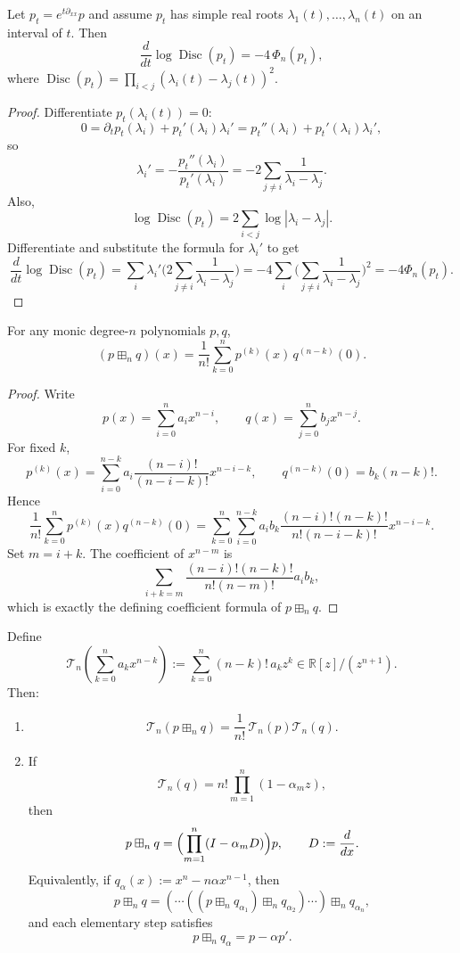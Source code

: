 \begin{lemma}\label{lem:q4-debruijn}
Let $p_t=e^{t\partial_{xx}}p$ and assume $p_t$ has simple real roots $\lambda_1(t),\dots,\lambda_n(t)$ on an interval of $t$. Then
\[
\frac{d}{dt}\log\operatorname{Disc}(p_t)=-4\,\Phi_n(p_t),
\]
where $\operatorname{Disc}(p_t)=\prod_{i<j}(\lambda_i(t)-\lambda_j(t))^2$.
\end{lemma}

\begin{proof}
Differentiate $p_t(\lambda_i(t))=0$:
\[
0=\partial_t p_t(\lambda_i)+p_t'(\lambda_i)\lambda_i'=p_t''(\lambda_i)+p_t'(\lambda_i)\lambda_i',
\]
so
\[
\lambda_i'=-\frac{p_t''(\lambda_i)}{p_t'(\lambda_i)}=-2\sum_{j\ne i}\frac{1}{\lambda_i-\lambda_j}.
\]
Also,
\[
\log\operatorname{Disc}(p_t)=2\sum_{i<j}\log|\lambda_i-\lambda_j|.
\]
Differentiate and substitute the formula for $\lambda_i'$ to get
\[
\frac{d}{dt}\log\operatorname{Disc}(p_t)
=\sum_i \lambda_i'\Big(2\sum_{j\ne i}\frac{1}{\lambda_i-\lambda_j}\Big)
=-4\sum_i\Big(\sum_{j\ne i}\frac{1}{\lambda_i-\lambda_j}\Big)^2
=-4\Phi_n(p_t).
\]
\end{proof}

\begin{lemma}\label{lem:q4-diffrepr}
For any monic degree-$n$ polynomials $p,q$,
\[
(p\boxplus_n q)(x)=\frac{1}{n!}\sum_{k=0}^{n} p^{(k)}(x)\,q^{(n-k)}(0).
\]
\end{lemma}

\begin{proof}
Write
\[
p(x)=\sum_{i=0}^n a_i x^{n-i},\qquad q(x)=\sum_{j=0}^n b_j x^{n-j}.
\]
For fixed $k$,
\[
p^{(k)}(x)=\sum_{i=0}^{n-k} a_i\frac{(n-i)!}{(n-i-k)!}x^{n-i-k},
\qquad
q^{(n-k)}(0)=b_k (n-k)!.
\]
Hence
\[
\frac1{n!}\sum_{k=0}^{n} p^{(k)}(x)q^{(n-k)}(0)
=
\sum_{k=0}^{n}\sum_{i=0}^{n-k}
a_i b_k\frac{(n-i)!(n-k)!}{n!(n-i-k)!}x^{n-i-k}.
\]
Set $m=i+k$. The coefficient of $x^{n-m}$ is
\[
\sum_{i+k=m}\frac{(n-i)!(n-k)!}{n!(n-m)!}a_i b_k,
\]
which is exactly the defining coefficient formula of $p\boxplus_n q$.
\end{proof}

\begin{lemma}\label{lem:q4-transform-factor}
Define
\[
\mathcal T_n\!\left(\sum_{k=0}^{n}a_k x^{n-k}\right):=
\sum_{k=0}^{n}(n-k)!\,a_k z^k\in \mathbb R[z]/(z^{n+1}).
\]
Then:
\begin{enumerate}
\item
\[
\mathcal T_n(p\boxplus_n q)=\frac1{n!}\,\mathcal T_n(p)\mathcal T_n(q).
\]
\item If
\[
\mathcal T_n(q)=n!\prod_{m=1}^{n}(1-\alpha_m z),
\]
then
\[
p\boxplus_n q
=
 \Bigl(\prod_{m=1}^{n}(I-\alpha_m D)\Bigr)p,
\qquad D:=\frac{d}{dx}.
\]
Equivalently, if $q_{\alpha}(x):=x^n-n\alpha x^{n-1}$, then
\[
p\boxplus_n q
=
(\cdots((p\boxplus_n q_{\alpha_1})\boxplus_n q_{\alpha_2})\cdots)\boxplus_n q_{\alpha_n},
\]
and each elementary step satisfies
\[
p\boxplus_n q_{\alpha}=p-\alpha p'.
\]
\end{enumerate}
\end{lemma}

